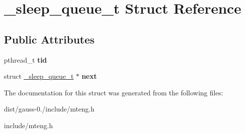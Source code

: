 \hypertarget{struct__sleep__queue__t}{\section{\-\_\-sleep\-\_\-queue\-\_\-t Struct Reference}
\label{struct__sleep__queue__t}
}
\subsection*{Public Attributes}
\begin{DoxyCompactItemize}
\item 
\hypertarget{struct__sleep__queue__t_ad8d7efe8357e7783029e6950e5bd877f}{pthread\-\_\-t {\bfseries tid}}\label{struct__sleep__queue__t_ad8d7efe8357e7783029e6950e5bd877f}

\item 
\hypertarget{struct__sleep__queue__t_a76dd1931e564ef87ede747c20250dbe6}{struct \hyperlink{struct__sleep__queue__t}{\-\_\-sleep\-\_\-queue\-\_\-t} $\ast$ {\bfseries next}}\label{struct__sleep__queue__t_a76dd1931e564ef87ede747c20250dbe6}

\end{DoxyCompactItemize}


The documentation for this struct was generated from the following files\-:\begin{DoxyCompactItemize}
\item 
dist/gauss-\/0./include/mteng.\-h\item 
include/mteng.\-h\end{DoxyCompactItemize}
